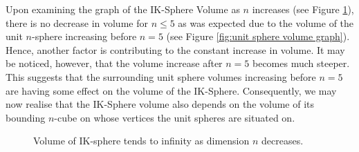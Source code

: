 Upon examining the graph of the IK-Sphere Volume as $n$ increases (see Figure \ref{fig:IK sphere volume to infinity graph}), there is no decrease in volume for $n \leq 5$ as was expected due to the volume of the unit $n$-sphere increasing before $n=5$ (see Figure \ref{fig:unit sphere volume graph}). Hence, another factor is contributing to the constant increase in volume. It may be noticed, however, that the volume increase after $n=5$ becomes much steeper. This suggests that the surrounding unit sphere volumes increasing before $n=5$ are having some effect on the volume of the IK-Sphere. Consequently, we may now realise that the IK-Sphere volume also depends on the volume of its bounding $n$-cube on whose vertices the unit spheres are situated on. 

\begin{figure}[h]
    \centering
    \caption{Volume of IK-sphere tends to infinity as dimension $n$ decreases.}
    \label{fig:IK sphere volume to infinity graph}
\end{figure}


